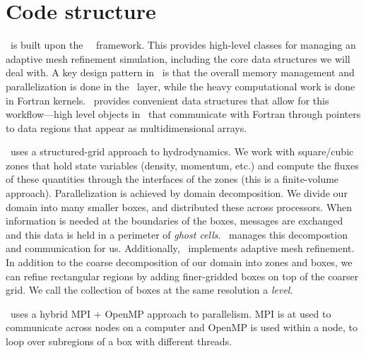 \section{Code structure}

\castro\ is built upon the \boxlib\ \cpp\ framework.  This provides
high-level classes for managing an adaptive mesh refinement
simulation, including the core data structures we will deal with.  A
key design pattern in \boxlib\ is that the overall memory management
and parallelization is done in the \cpp\ layer, while the heavy
computational work is done in Fortran kernels.  \boxlib\ provides
convenient data structures that allow for this workflow---high level
objects in \cpp\ that communicate with Fortran through pointers to
data regions that appear as multidimensional arrays.

\castro\ uses a structured-grid approach to hydrodynamics.  We work
with square/cubic zones that hold state variables (density, momentum,
etc.)  and compute the fluxes of these quantities through the
interfaces of the zones (this is a finite-volume approach).
Parallelization is achieved by domain decomposition.  We divide our
domain into many smaller boxes, and distributed these across
processors.  When information is needed at the boundaries of the
boxes, messages are exchanged and this data is held in a perimeter of
{\em ghost cells}.  \boxlib\ manages this decompostion and
communication for us.  Additionally, \boxlib\ implements adaptive mesh
refinement.  In addition to the coarse decomposition of our domain
into zones and boxes, we can refine rectangular regions by adding
finer-gridded boxes on top of the coarser grid.  We call the
collection of boxes at the same resolution a {\em level}.

\castro\ uses a hybrid MPI + OpenMP approach to parallelism.  MPI is
at used to communicate across nodes on a computer and OpenMP is used
within a node, to loop over subregions of a box with different
threads.

